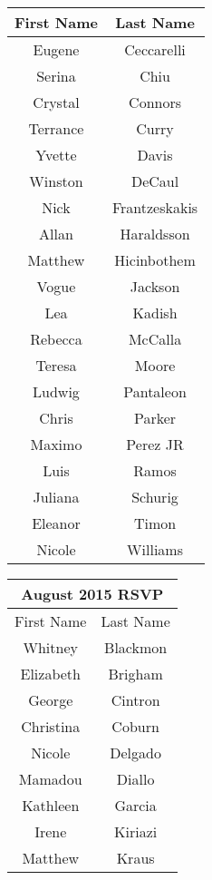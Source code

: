 \documentclass[12pt,dvipsnames]{article}
\begin{document}
\begin{table}
\begin{tabular}{|c|c|}
		First Name & Last Name\\ 
		\hline
		Eugene & Ceccarelli\\ 
		\hline
		Serina & Chiu\\ 
		\hline
		Crystal & Connors\\ 
		\hline
		Terrance & Curry\\ 
		\hline
		Yvette & Davis\\ 
		\hline
		Winston & DeCaul\\ 
		\hline
		Nick & Frantzeskakis\\ 
		\hline
		Allan & Haraldsson\\ 
		\hline
		Matthew & Hicinbothem\\ 
		\hline
		Vogue & Jackson\\ 
		\hline
		Lea & Kadish\\ 
		\hline
		Rebecca  & McCalla\\ 
		\hline
		Teresa & Moore\\ 
		\hline
		Ludwig  & Pantaleon\\ 
		\hline
		Chris & Parker\\ 
		\hline
		Maximo & Perez JR\\ 
		\hline
		Luis & Ramos\\ 
		\hline
		Juliana & Schurig\\ 
		\hline
		Eleanor & Timon\\ 
		\hline
		Nicole  & Williams\\ 
		\hline\end{tabular}
 \hfill
	\begin{tabular}{|c|c|}
				\multicolumn{2}{c}{\bfseries August 2015 RSVP}\\\hline
		First Name & Last Name\\ 
		\hline
		Whitney & Blackmon\\ 
		\hline
		Elizabeth & Brigham\\ 
		\hline
		George & Cintron\\ 
		\hline
		Christina & Coburn\\ 
		\hline
		Nicole & Delgado\\ 
		\hline
		Mamadou & Diallo\\ 
		\hline
		Kathleen & Garcia\\ 
		\hline
		Irene & Kiriazi\\ 
		\hline
		Matthew & Kraus\\ 

\end{tabular}
\end{table}
\end{document}
